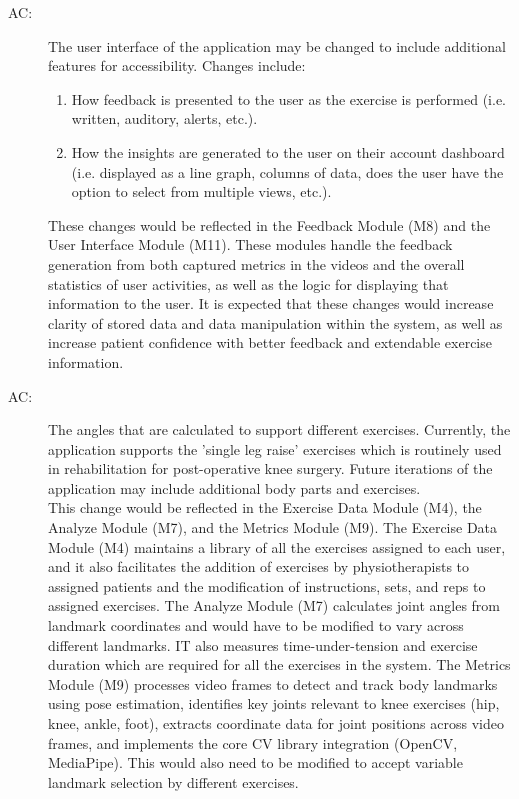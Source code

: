 \documentclass[12pt, titlepage]{article}
\newcounter{acnum}
\newcommand{\actheacnum}{AC\theacnum}
\begin{document}
\begin{description}
\item[ \actheacnum \label{AC1}:]
The user interface of the application may be changed to include additional features for accessibility. Changes include:
\begin{enumerate}
  \item How feedback is presented to the user as the exercise is performed (i.e. written, auditory, alerts, etc.).
  \item How the insights are generated to the user on their account dashboard (i.e. displayed as a line graph, columns of data, does the user have the option to select from multiple views, etc.).
\end{enumerate}
These changes would be reflected in the Feedback Module (M8) and the User Interface Module (M11). These modules handle the feedback generation from both captured metrics in the videos and the overall statistics of user activities, as well as the logic for displaying that information to the user. It is expected that these changes would increase clarity of stored data and data manipulation within the system, as well as increase patient confidence with better feedback and extendable exercise information.
\item[ \actheacnum \label{AC2}:]
The angles that are calculated to support different exercises. Currently, the application supports the 'single leg raise' exercises which is routinely used in rehabilitation for post-operative knee surgery. Future iterations of the application may include additional body parts and exercises. \\
This change would be reflected in the Exercise Data Module (M4), the Analyze Module (M7), and the Metrics Module (M9). The Exercise Data Module (M4) maintains a library of all the exercises assigned to each user, and it also facilitates the addition of exercises by physiotherapists to assigned patients and the modification of instructions, sets, and reps to assigned exercises. The Analyze Module (M7) calculates joint angles from landmark coordinates and would have to be modified to vary across different landmarks. IT also measures time-under-tension and exercise duration which are required for all the exercises in the system. The Metrics Module (M9) processes video frames to detect and track body landmarks using pose estimation, identifies key joints relevant to knee exercises (hip, knee, ankle, foot), extracts coordinate data for joint positions across video frames, and implements the core CV library integration (OpenCV, MediaPipe). This would also need to be modified to accept variable landmark selection by different exercises.

\end{description}
\end{document}
